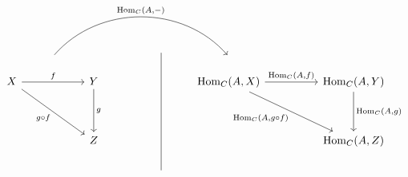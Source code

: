 \documentclass[uplatex,a4j,12pt,dvipdfmx]{jsarticle}
\begin{document}
\[
	\begin{tikzcd}
		& {} \arrow[rrrr, "{{\rm Hom}_{C}(A, -)}", bend left=49, shift right=4] &           & {}              &  & {}                                    &  &                                \\
		X \arrow[rrdd, "g \circ f"'] \arrow[rr, "f"] &                                  & Y \arrow[dd, "g"] &                 &  & {{\rm Hom}_{C}(A,X)} \arrow[rr, "{{\rm Hom}_{C}(A, f)}"] \arrow[rrdd, "{{\rm Hom}_{C}(A, g \circ f)}"'] &  & {{\rm Hom}_{C}(A, Y)} \arrow[dd, "{{\rm Hom}_{C}(A, g)}"] \\
		&                                  &                   &                 &  &                                  &  &                                \\
		&                                  & Z                 &                 &  &                                  &  & {{\rm Hom}_{C}(A, Z)}          \\
		&                                  &                   & {} \arrow[uuuu, no head, shift right=10] &  &                                  &  &
	\end{tikzcd}
\]
\end{document}
